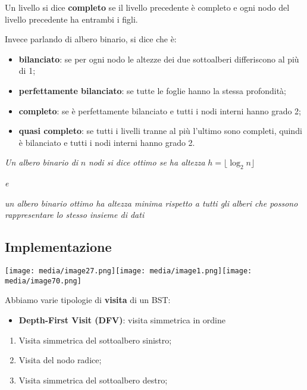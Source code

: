 Un livello si dice \textbf{completo} se il livello precedente è completo
e ogni nodo del livello precedente ha entrambi i figli.

Invece parlando di albero binario, si dice che è:

\begin{itemize}
\item
  \textbf{bilanciato}: se per ogni nodo le altezze dei due sottoalberi
  differiscono al più di 1;
\item
  \textbf{perfettamente bilanciato}: se tutte le foglie hanno la stessa
  profondità;
\item
  \textbf{completo}: se è perfettamente bilanciato e tutti i nodi
  interni hanno grado 2;
\item
  \textbf{quasi completo}: se tutti i livelli tranne al più l'ultimo
  sono completi, quindi è bilanciato e tutti i nodi interni hanno grado
  2.
\end{itemize}

\emph{Un albero binario di} \(n\) \emph{nodi si dice ottimo se ha
altezza} \(h = \lfloor\log_{2}n\rfloor\)

\emph{e}

\emph{un albero binario ottimo ha altezza minima rispetto a tutti gli
alberi che possono rappresentare lo stesso insieme di dati}

\subsection{Implementazione}\label{implementazione-1}

\texttt{[image: media/image27.png]}\texttt{[image: media/image1.png]}\texttt{[image: media/image70.png]}

Abbiamo varie tipologie di \textbf{visita} di un BST:

\begin{itemize}
\item
  \textbf{Depth-First Visit (DFV)}: visita simmetrica in ordine
\end{itemize}

\begin{enumerate}
\def\labelenumi{\arabic{enumi}.}
\item
  Visita simmetrica del sottoalbero sinistro;
\item
  Visita del nodo radice;
\item
  Visita simmetrica del sottoalbero destro;
\end{enumerate}

